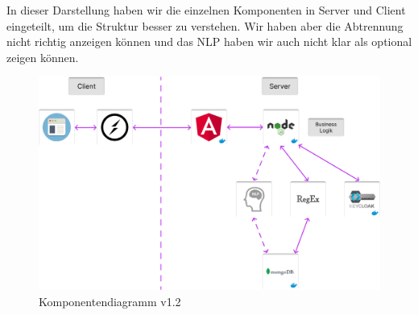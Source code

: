 \noindent In dieser Darstellung haben wir die einzelnen Komponenten in Server und Client 
eingeteilt, um die Struktur besser zu verstehen. Wir haben aber die Abtrennung nicht richtig anzeigen können
und das NLP haben wir auch nicht klar als optional zeigen können.

    \begin{figure}[!hbt]
        \centering
        \includegraphics[width=1.0\textwidth]{bilder/technologien/Komponentendiagram v1.2.png}
        \caption{Komponentendiagramm v1.2}
        \label{fig:Komponentendiagramm_v1.2}
        \end{figure}
        \FloatBarrier %
    